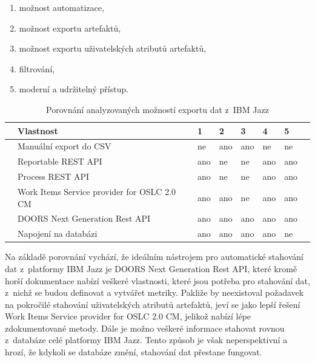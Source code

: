 \documentclass[czech,master]{diploma}
\begin{document}
\begin{enumerate}
\item možnost automatizace,
\item možnost exportu artefaktů,
\item možnost exportu uživatelských atributů artefaktů,
\item filtrování,
\item moderní a udržitelný přístup.
\end{enumerate}

\begin{table}[htp]
\centering
\begin{tabular}{@{}llllllll@{}}
\toprule
 & \textbf{Vlastnost}                          & \textbf{1} & \textbf{2} & \textbf{3} & \textbf{4} & \textbf{5} &  \\ \midrule
 & Manuální export do CSV                      & ne         & ano        & ano        & ne         & ne         &  \\
 & Reportable REST API                         & ano        & ne         & ne         & ano        & ano        &  \\
 & Process REST API                            & ano        & ne         & ne         & ano        & ano        &  \\
 & Work Items Service provider for OSLC 2.0 CM & ano        & ano        & ne         & ano        & ano        &  \\
 & DOORS Next Generation Rest API              & ano        & ano        & ano        & ano        & ano        &  \\
 & Napojení na databázi                        & ano        & ano        & ano        & ano        & ne         &  \\ \bottomrule
\end{tabular}
\caption{Porovnání analyzovaných možností exportu dat z~IBM Jazz}
\label{tab:ibm_jazz_export}
\end{table}

Na základě porovnání vychází, že ideálním nástrojem pro automatické stahování dat z~platformy IBM Jazz je  DOORS Next Generation Rest API, které kromě horší dokumentace nabízí veškeré vlastnosti, které jsou potřeba pro stahování dat, z~nichž se budou definovat a vytvářet metriky. Pakliže by neexistoval požadavek na pokročilé stahování uživatelských atributů artefaktů, jeví se jako lepší řešení Work Items Service provider for OSLC 2.0 CM, jelikož nabízí lépe zdokumentované metody. Dále je možno veškeré informace stahovat rovnou z~databáze celé platformy IBM Jazz. Tento způsob je však neperspektivní a hrozí, že kdykoli se databáze změní, stahování dat přestane fungovat.
\end{document}
